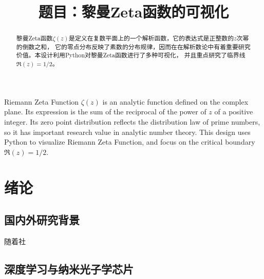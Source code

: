 \documentclass[no-math,bwprint]{YangThesis}
\title{\textbf{题目：黎曼Zeta函数的可视化}}
\begin{document}
  \maketitle
 \setcounter{page}{1}
 
 \begin{abstract}
 黎曼Zeta函数$\zeta(z)$是定义在复数平面上的一个解析函数，它的表达式是正整数的$z$次幂的倒数之和，
 它的零点分布反映了素数的分布规律，因而在在解析数论中有着重要研究价值。本设计利用Python对黎曼Zeta函数进行了多种可视化，
 并且重点研究了临界线$\Re(z) = 1 / 2 $。

\end{abstract}
\begin{abstracten}
 
	Riemann Zeta Function $\zeta(z)$ is an analytic function defined on the complex plane. 
	Its expression is the sum of the reciprocal of the power of $z$ of a positive integer.
	Its zero point distribution reflects the distribution law of prime numbers, 
	so it has important research value in analytic number theory. This design uses Python to visualize Riemann Zeta Function,
	and focus on the critical boundary $\Re(z) = 1 / 2 $.
\end{abstracten}	
\vspace{-1.3cm}
\tableofcontents

\clearpage
\vspace{-1cm}
\section{绪论}
\setcounter{page}{1}
\subsection{国内外研究背景}
随着社
\subsection{深度学习与纳米光子学芯片}
\end{document}

